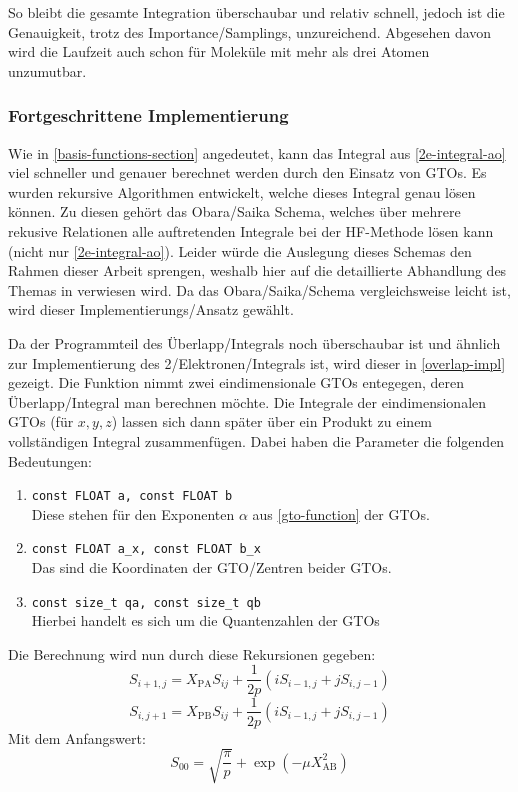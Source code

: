 So bleibt die gesamte Integration überschaubar und relativ schnell,
jedoch ist die Genauigkeit, trotz des Importance\-/Samplings, unzureichend.
Abgesehen davon wird die Laufzeit auch schon für Moleküle mit mehr als drei Atomen unzumutbar.

\subsubsection{Fortgeschrittene Implementierung}

Wie in \cref{basis-functions-section} angedeutet, kann das Integral aus \cref{2e-integral-ao}
viel schneller und genauer berechnet werden durch den Einsatz von GTOs.
Es wurden rekursive Algorithmen entwickelt, welche dieses Integral genau lösen können.
Zu diesen gehört das Obara\-/Saika Schema, welches über mehrere rekusive Relationen alle
auftretenden Integrale bei der HF-Methode lösen kann (nicht nur \cref{2e-integral-ao}).
Leider würde die Auslegung dieses Schemas den Rahmen dieser Arbeit sprengen,
weshalb hier auf die detaillierte Abhandlung des Themas in
\cite[Kapitel 9 bzw. 9.10]{structure_2013} verwiesen wird.
Da das Obara\-/Saika\-/Schema vergleichsweise leicht ist, wird dieser Implementierungs\-/Ansatz 
gewählt.

Da der Programmteil des Überlapp\-/Integrals noch überschaubar ist und ähnlich zur Implementierung
des 2\-/Elektronen\-/Integrals ist, wird dieser in \cref{overlap-impl} gezeigt. Die Funktion nimmt
zwei eindimensionale GTOs entegegen, deren Überlapp\-/Integral man berechnen möchte.
Die Integrale der eindimensionalen GTOs (für $x,y,z$) lassen sich dann später über ein Produkt
zu einem vollständigen Integral zusammenfügen. Dabei haben die Parameter die folgenden Bedeutungen:
\begin{enumerate}
    \item \texttt{const FLOAT a, const FLOAT b}\\
    Diese stehen für den Exponenten $\alpha$ aus \cref{gto-function} der GTOs.
    \item \texttt{const FLOAT a_x, const FLOAT b_x}\\
    Das sind die Koordinaten der GTO\-/Zentren beider GTOs.
    \item \texttt{const size_t qa, const size_t qb}\\
    Hierbei handelt es sich um die Quantenzahlen der GTOs
\end{enumerate}

Die Berechnung wird nun durch diese Rekursionen gegeben:
\begin{equation}
    S_{i+1,j} = X_\text{PA}S_{ij} + \frac{1}{2p}(iS_{i-1,j} + jS_{i,j-1})
\end{equation}
\begin{equation}
    S_{i,j+1} = X_\text{PB}S_{ij} + \frac{1}{2p}(iS_{i-1,j} + jS_{i,j-1})
\end{equation}
Mit dem Anfangswert:
\begin{equation}
    S_{00} = \sqrt{\frac{\pi}{p}} + \exp(-\mu X^2_\text{AB})
\end{equation}

